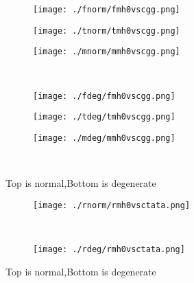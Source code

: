 \documentclass[aps,floats,floatfix,nofootinbib]{revtex4-1}
\begin{document}
\begin{center}
\begin{figure}
\begin{subfigure}{0.3\textwidth}
\texttt{[image: ./fnorm/fmh0vscgg.png]}
\label{}
\end{subfigure}
\begin{subfigure}{0.3\textwidth}
\texttt{[image: ./tnorm/tmh0vscgg.png]}
\label{}
\end{subfigure}
\begin{subfigure}{0.3\textwidth}
\texttt{[image: ./mnorm/mmh0vscgg.png]}
\label{}
\end{subfigure}\\
\begin{subfigure}{0.3\textwidth}
\texttt{[image: ./fdeg/fmh0vscgg.png]}
\label{}
\end{subfigure}
\begin{subfigure}{0.3\textwidth}
\texttt{[image: ./tdeg/tmh0vscgg.png]}
\label{}
\end{subfigure}
\begin{subfigure}{0.3\textwidth}
\texttt{[image: ./mdeg/mmh0vscgg.png]}
\label{}
\end{subfigure}\\
\caption{Top is normal,Bottom is degenerate}
\end{figure}
\end{center}

\begin{center}
\begin{figure}
\begin{subfigure}{0.95\textwidth}
\texttt{[image: ./rnorm/rmh0vsctata.png]}
\label{}
\end{subfigure}\\
\begin{subfigure}{0.95\textwidth}
\texttt{[image: ./rdeg/rmh0vsctata.png]}
\label{}
\end{subfigure}
\caption{Top is normal,Bottom is degenerate}
\end{figure}
\end{center}
\end{document}
